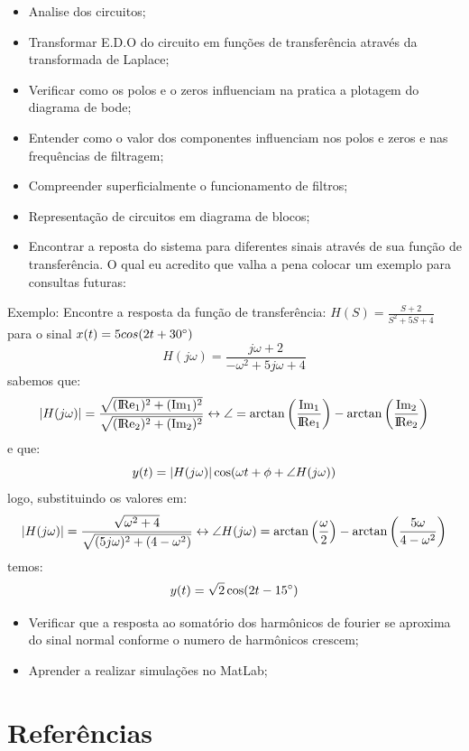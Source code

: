 \documentclass[a4paper, 12pt]{article}
\begin{document}
		\begin{itemize}
			\item Analise dos circuitos;
			\item Transformar E.D.O do circuito em funções de transferência através da transformada de Laplace;
			\item Verificar como os polos e o zeros influenciam na pratica a plotagem do diagrama de bode;
			\item Entender como o valor dos componentes influenciam nos polos e zeros e nas frequências de filtragem;
			\item Compreender superficialmente o funcionamento de filtros;
			\item Representação de circuitos em diagrama de blocos;
			\item Encontrar a reposta do sistema para diferentes sinais através de sua função de transferência. O qual eu acredito que valha a pena colocar um exemplo para consultas futuras:
		\end{itemize}
		Exemplo: Encontre a resposta da função de transferência:
		$H(S) = \frac{S+2}{S^{2} + 5S + 4}$ para o sinal $x(t) = 5cos(2t + 30\degree)$
		\[
			H(j\omega) = \frac{j\omega + 2}{-\omega^{2} + 5j\omega + 4}
		\]
		sabemos que:
		\[
		\arrowvert H(j\omega) \arrowvert = \frac{\sqrt{(\rm I\!Re_{1})^{2} + (\rm Im_{1})^{2}}}{\sqrt{(\rm I\!Re_{2})^{2} + (\rm Im_{2})^{2}}} \leftrightarrow \angle = \arctan\left(\frac{\rm Im_{1}}{\rm I\!Re_{1}}\right) - \arctan\left(\frac{\rm Im_{2}}{\rm I\!Re_{2}}\right)
		\]
		e que:
		\[
		y(t) = \arrowvert H(j\omega) \arrowvert \cos(\omega t + \phi + \angle H(j\omega))
		\]
		logo, substituindo os valores em:
		\[
		\arrowvert H(j\omega) \arrowvert = \frac{\sqrt{\omega^{2} + 4}}{\sqrt{(5j\omega)^{2} + (4 - \omega^{2})}} \leftrightarrow \angle H(j\omega) = \arctan\left(\frac{\omega}{2}\right) - \arctan\left(\frac{5\omega}{4 - \omega^{2}}\right)
		\]
		temos:
		\[
		y(t) = \sqrt{2}\cos(2t - 15\degree)
		\]
		\begin{itemize}
			\item Verificar que a resposta ao somatório dos harmônicos de fourier se aproxima do sinal normal conforme o numero de harmônicos crescem;
			\item Aprender a realizar simulações no MatLab;

		\end{itemize}

	\newpage
	\section{Referências}
\end{document}

